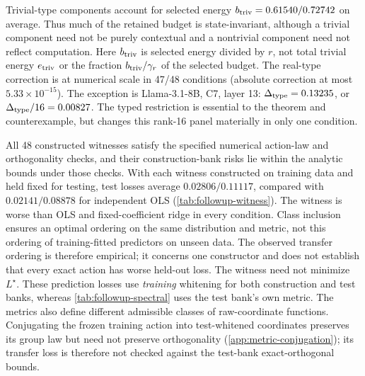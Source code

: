 Trivial-type components account for selected energy $b_{\rm triv}=0.61540/0.72742$ on average. Thus much of the retained budget is state-invariant, although a trivial component need not be purely contextual and a nontrivial component need not reflect computation. Here $b_{\rm triv}$ is selected energy divided by $r$, not total trivial energy $e_{\rm triv}$ or the fraction $b_{\rm triv}/\gamma_r$ of the selected budget. The real-type correction is at numerical scale in 47/48 conditions (absolute correction at most $5.33\times10^{-15}$). The exception is Llama-3.1-8B, C7, layer 13: $\Delta_{\rm type}=0.13235$, or $\Delta_{\rm type}/16=0.00827$. The typed restriction is essential to the theorem and counterexample, but changes this rank-16 panel materially in only one condition.


All 48 constructed witnesses satisfy the specified numerical action-law and orthogonality checks, and their construction-bank risks lie within the analytic bounds under those checks. With each witness constructed on training data and held fixed for testing, test losses average $0.02806/0.11117$, compared with $0.02141/0.08878$ for independent OLS (\cref{tab:followup-witness}). The witness is worse than OLS and fixed-coefficient ridge in every condition. Class inclusion ensures an optimal ordering on the same distribution and metric, not this ordering of training-fitted predictors on unseen data. The observed transfer ordering is therefore empirical; it concerns one constructor and does not establish that every exact action has worse held-out loss. The witness need not minimize $L^\star$. These prediction losses use \emph{training} whitening for both construction and test banks, whereas \cref{tab:followup-spectral} uses the test bank's own metric. The metrics also define different admissible classes of raw-coordinate functions. Conjugating the frozen training action into test-whitened coordinates preserves its group law but need not preserve orthogonality (\cref{app:metric-conjugation}); its transfer loss is therefore not checked against the test-bank exact-orthogonal bounds.

\begin{table}[t]
\centering\small

\caption{Same-metric reference and class-risk premium at $r=16$ on the original Study~2 test bank. Each domain averages \BoundedCellsPerDomain{} fixed cells equally. $p^-=\max\{0,2(1-\gamma_r)-\eta\}$ and $p^+=2(1-\gamma_r^2)-\eta$ are computed per cell before averaging. They bound the mean cost of imposing exact laws and orthogonality jointly. $L(I)$ uses total trivial energy and was also checked by direct residuals on the saved coordinates. These are finite-bank quantities, not transfer losses or confidence limits.}
\label{tab:bounded-risk}
\end{table}

